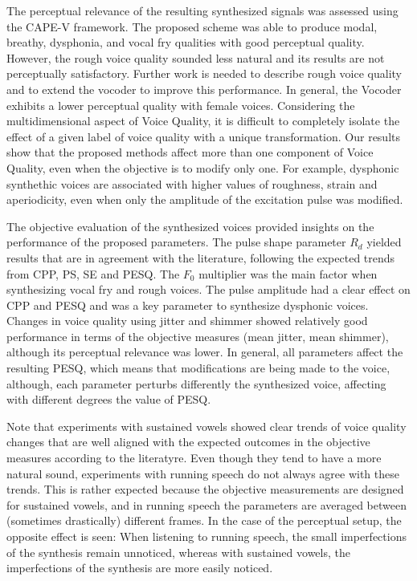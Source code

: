 \documentclass[final,5p,times,twocolumn]{elsarticle}
\begin{document}
The perceptual relevance of the resulting synthesized signals was assessed using the CAPE-V framework. The proposed scheme was able to produce modal, breathy, dysphonia, and vocal fry qualities with good perceptual quality. However, the rough voice quality sounded less natural and its results are not perceptually satisfactory. Further work is needed to describe rough voice quality and to extend the vocoder to improve this performance. In general, the Vocoder exhibits a lower perceptual quality with female voices. Considering the multidimensional aspect of Voice Quality, it is difficult to completely isolate the effect of a given label of voice quality with a unique transformation. Our results show that the proposed methods affect more than one component of Voice Quality, even when the objective is to modify only one. For example, dysphonic synthethic voices are associated with higher values of roughness, strain and aperiodicity, even when only the amplitude of the excitation pulse was modified.

The objective evaluation of the synthesized voices provided insights on the performance of the proposed parameters. The pulse shape parameter $R_d$ yielded results that are in agreement with the literature, following the expected trends from CPP, PS, SE and PESQ. The $F_0$ multiplier was the main factor when synthesizing vocal fry and rough voices. The pulse amplitude had a clear effect on CPP and PESQ and was a key parameter to synthesize dysphonic voices. Changes in voice quality using jitter and shimmer showed relatively good performance in terms of the objective measures (mean jitter, mean shimmer), although its perceptual relevance was lower. In general, all parameters affect the resulting PESQ, which means that modifications are being made to the voice, although, each parameter perturbs differently the synthesized voice, affecting with different degrees the value of PESQ.

Note that experiments with sustained vowels showed clear trends of voice quality changes that are well aligned with the expected outcomes in the objective measures according to the literatyre. Even though they tend to have a more natural sound, experiments with running speech do not always agree with these trends. This is rather expected because the objective measurements are designed for sustained vowels, and in running speech the parameters are averaged between (sometimes drastically) different frames. In the case of the perceptual setup, the opposite effect is seen: When listening to running speech, the small imperfections of the synthesis remain unnoticed, whereas with sustained vowels, the imperfections of the synthesis are more easily noticed.
\end{document}
